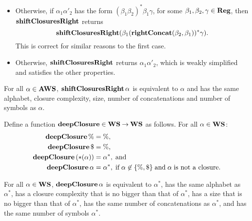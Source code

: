 \begin{itemize}
\item Otherwise, if $\alpha_1\alpha'_2$ has the form
  $(\beta_1\beta_2)^*\beta_1\gamma$, for some
  $\beta_1,\beta_2,\gamma\in\mathbf{Reg}$, then $\mathbf{shiftClosuresRight}$ returns
  \begin{displaymath}
   \mathbf{shiftClosuresRight}(\beta_1(\mathbf{rightConcat}(\beta_2,\beta_1))^*\gamma) . 
  \end{displaymath}
  This is correct for similar reasons to the first case.

\item Otherwise, $\mathbf{shiftClosuresRight}$ returns $\alpha_1\alpha'_2$,
  which is weakly simplified and satisfies the other properties.
\end{itemize}

\begin{proposition}
\label{ShiftClosuresRightLem}
For all $\alpha\in\mathbf{AWS}$, $\mathbf{shiftClosuresRight}\,\alpha$ is equivalent
to $\alpha$ and has the same alphabet, closure complexity, size,
number of concatenations and number of symbols as $\alpha$.
\end{proposition}

Define a function $\mathbf{deepClosure}\in\mathbf{WS}\mathbin{\to}\mathbf{WS}$ as follows.  For all
$\alpha\in\mathbf{WS}$:
\begin{align*}
  \mathbf{deepClosure}\,\% &= \% , \\
  \mathbf{deepClosure}\,\$ &= \% , \\
  \mathbf{deepClosure}\,({*}(\alpha)) &= \alpha^* , \;\allowbreak\mbox{and}\allowbreak\; \\
  \mathbf{deepClosure}\,\alpha &= \alpha^*, \;\allowbreak\mbox{if}\allowbreak\;
  \alpha\not\in\{\%,\$\} \;\allowbreak\mbox{and}\allowbreak\; \alpha \;\allowbreak\mbox{is not a closure.}\allowbreak
\end{align*}

\begin{lemma}
\label{DeepClosureLem}
For all $\alpha\in\mathbf{WS}$, $\mathbf{deepClosure}\,\alpha$ is equivalent to
$\alpha^*$, has the same alphabet as $\alpha^*$, has a closure
complexity that is no bigger than that of $\alpha^*$, has a size that
is no bigger than that of $\alpha^*$, has the same number of
concatenations as $\alpha^*$, and has the same number of symbols
$\alpha^*$.
\end{lemma}

